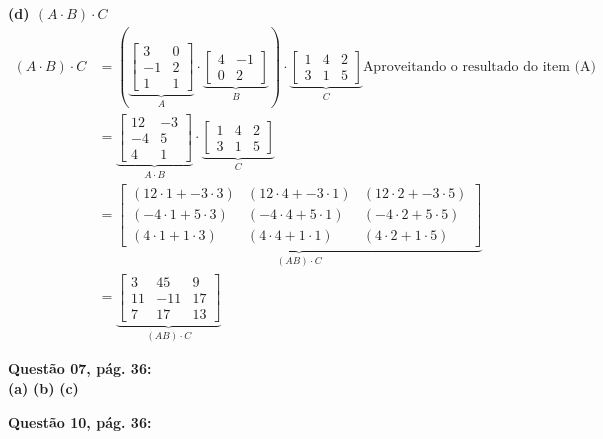 \documentclass[a4paper,12pt]{article}
\begin{document}
\textbf{(d) $(A\cdot B)\cdot C$}
\begin{align*}
    (A\cdot B)\cdot C &=( 
    \underbrace{
    \begin{bmatrix}
        3 & 0\\
        -1 & 2\\
        1 & 1
    \end{bmatrix}}_{A} 
    \cdot
    \underbrace{
    \begin{bmatrix}
        4 & -1\\
        0 & 2
    \end{bmatrix}}_{B})
    \cdot
    \underbrace{
    \begin{bmatrix}
        1 & 4 & 2\\
        3 & 1 & 5
    \end{bmatrix}}_{C}
    \textrm{Aproveitando o resultado do item (A)} \\
    &=
    \underbrace{
    \begin{bmatrix}
        12 & -3\\
        -4 & 5 \\
        4 & 1
    \end{bmatrix}}_{A \cdot B}
    \cdot
    \underbrace{
    \begin{bmatrix}
        1 & 4 & 2\\
        3 & 1 & 5
    \end{bmatrix}}_{C} \\
    &=
    \underbrace{
    \begin{bmatrix}
        (12 \cdot 1 + -3 \cdot 3) & (12 \cdot 4 + -3 \cdot 1) & (12 \cdot 2 + -3 \cdot 5)\\
        (-4 \cdot 1 + 5 \cdot 3) & (-4 \cdot 4 + 5 \cdot 1) & (-4 \cdot 2 + 5 \cdot 5)\\
        (4 \cdot 1 + 1 \cdot 3) & (4 \cdot 4 + 1 \cdot 1) & (4 \cdot 2 + 1 \cdot 5)
    \end{bmatrix}}_{(AB) \cdot C} \\
    &=
    \underbrace{
    \begin{bmatrix}
        3 & 45 & 9 \\
        11 & -11 & 17 \\
        7 & 17 & 13
    \end{bmatrix}}_{(AB) \cdot C}
\end{align*}


\textbf{Questão 07, pág. 36:}\\
\textbf{(a)}
\textbf{(b)}
\textbf{(c)}

\textbf{Questão 10, pág. 36:}\\
\end{document}
